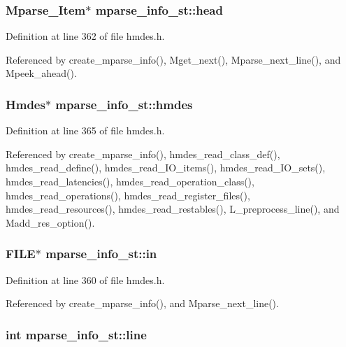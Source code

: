 \subsubsection{\setlength{\rightskip}{0pt plus 5cm}\bf{Mparse\_\-Item}$\ast$ \bf{mparse\_\-info\_\-st::head}}\label{structmparse__info__st_d63ca9bbfb2ac2a92c75c1fefd130978}




Definition at line 362 of file hmdes.h.

Referenced by create\_\-mparse\_\-info(), Mget\_\-next(), Mparse\_\-next\_\-line(), and Mpeek\_\-ahead().
\subsubsection{\setlength{\rightskip}{0pt plus 5cm}\bf{Hmdes}$\ast$ \bf{mparse\_\-info\_\-st::hmdes}}\label{structmparse__info__st_f95b69837519d3817bda320a0ad75e2c}




Definition at line 365 of file hmdes.h.

Referenced by create\_\-mparse\_\-info(), hmdes\_\-read\_\-class\_\-def(), hmdes\_\-read\_\-define(), hmdes\_\-read\_\-IO\_\-items(), hmdes\_\-read\_\-IO\_\-sets(), hmdes\_\-read\_\-latencies(), hmdes\_\-read\_\-operation\_\-class(), hmdes\_\-read\_\-operations(), hmdes\_\-read\_\-register\_\-files(), hmdes\_\-read\_\-resources(), hmdes\_\-read\_\-restables(), L\_\-preprocess\_\-line(), and Madd\_\-res\_\-option().
\subsubsection{\setlength{\rightskip}{0pt plus 5cm}FILE$\ast$ \bf{mparse\_\-info\_\-st::in}}\label{structmparse__info__st_d9ad6c79267b4cc06380ad963827e83d}




Definition at line 360 of file hmdes.h.

Referenced by create\_\-mparse\_\-info(), and Mparse\_\-next\_\-line().
\subsubsection{\setlength{\rightskip}{0pt plus 5cm}int \bf{mparse\_\-info\_\-st::line}}\label{structmparse__info__st_4c9a3d5a9fb0463083f6bbbfa407ece1}





